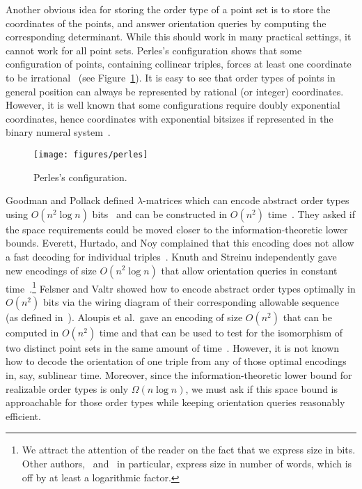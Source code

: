 Another obvious idea for storing the order type of a point set is to store
the coordinates of the points, and answer orientation queries
by computing the corresponding determinant. While this should work in many practical
settings, it cannot work for all point sets. Perles's configuration shows that
some configuration of points, containing collinear triples, forces at least one
coordinate to be irrational~\cite{Gr05}\ifeurocg\else%
(see Figure~\ref{fig:perles})\fi.
%
It is easy to see that
order types of points in general position can always be represented by rational
(or integer) coordinates.
%
However, it is well known that some configurations require doubly
exponential coordinates, hence coordinates with exponential bitsizes if
represented in the binary numeral system~\cite{GPS89}.

\ifeurocg\else%
\begin{figure}
	\centering{}
	\texttt{[image: figures/perles]}
	\caption{Perles's configuration.}\label{fig:perles}
\end{figure}
\fi%

Goodman and Pollack defined \(\lambda\)-matrices which can encode abstract order
types using \( O(n^2 \log{n}) \) bits~\cite{GP83} and can be constructed in
\(O(n^2)\) time~\cite{EOS86}. They asked if the space
requirements could be moved closer to the information-theoretic lower bounds.
Everett, Hurtado, and Noy complained that this encoding does not
allow a fast decoding for individual triples~\cite{EHN99}.
Knuth and Streinu independently gave new encodings of size \(O(n^2 \log n)\)
that allow orientation queries in constant time~\cite{Knu92,St97}.\footnote{%
We attract the attention of the reader on the fact that we express size in
bits.
Other authors,~\cite{EHN99} and~\cite{St97} in particular,
express size in number of words, which is off by at least a logarithmic factor.}
Felsner and Valtr showed how to encode abstract order types optimally in
\(O(n^2)\) bits via the wiring diagram of their corresponding allowable
sequence~\cite{Fe96, FV11} (as defined in~\cite{Go80}). Aloupis et al.\ gave
an encoding of size \(O(n^2)\) that can be computed in \(O(n^2)\) time and that
can be used to test for the isomorphism of two distinct point sets in the same
amount of time~\cite{AILOW14}. However, it is not known how to decode the
orientation of one triple from any of those optimal encodings in, say, sublinear time.
Moreover, since the information-theoretic lower bound for realizable order
types is only \(\Omega(n \log{n})\), we must ask if this space bound is
approachable for those order types while keeping orientation queries reasonably
efficient.
